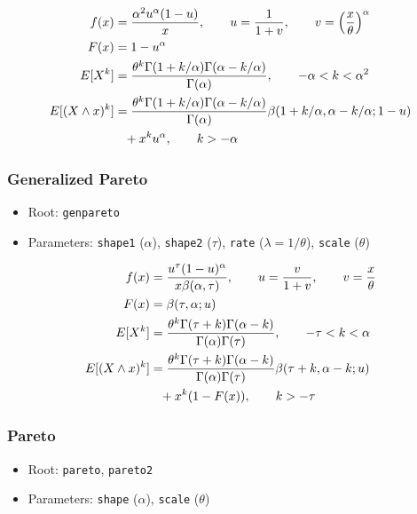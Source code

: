 \documentclass[x11names]{article}
\newcommand{\E}[1]{E[ #1 ]}
\newcommand{\code}[1]{\texttt{#1}}
\begin{document}
\begin{align*}
  f(x)
  &= \frac{\alpha^2 u^\alpha (1 - u)}{x},
    \qquad u = \frac{1}{1 + v},
    \qquad v = \left( \frac{x}{\theta} \right)^\alpha \\
  F(x)
  &= 1 - u^\alpha \\
  \E{X^k}
  &= \frac{%
    \theta^k \Gamma(1+k/\alpha) \Gamma(\alpha-k/\alpha)}{%
    \Gamma(\alpha)},
    \qquad -\alpha < k < \alpha^2 \\
  \E{(X \wedge x)^k}
  &= \frac{%
    \theta^k \Gamma(1+k/\alpha) \Gamma(\alpha-k/\alpha)}{%
    \Gamma(\alpha)}
    \beta(1+k/\alpha, \alpha-k/\alpha; 1-u) \\
  &\phantom{=} + x^k u^\alpha,
    \qquad k > -\alpha

\end{align*}

\subsubsection*{Generalized Pareto}

\begin{itemize}
\item Root: \code{genpareto}
\item Parameters: \code{shape1} ($\alpha$),
      \code{shape2} ($\tau$),
      \code{rate}   ($\lambda = 1/\theta$),
      \code{scale}  ($\theta$)
\end{itemize}

\begin{align*}
  f(x)
  &= \frac{u^\tau (1 - u)^\alpha}{x \beta (\alpha, \tau )},
    \qquad u = \frac{v}{1 + v},
    \qquad v = \frac{x}{\theta} \\
  F(x)
  &= \beta (\tau, \alpha ; u) \\
  \E{X^k}
  &= \frac{%
    \theta^k \Gamma(\tau+k) \Gamma(\alpha-k)}{%
    \Gamma(\alpha) \Gamma(\tau)},
    \qquad -\tau < k < \alpha \\
  \E{(X \wedge x)^k}
  &= \frac{%
    \theta^k \Gamma(\tau+k) \Gamma(\alpha-k)}{%
    \Gamma(\alpha) \Gamma(\tau)}
    \beta(\tau+k, \alpha-k; u) \\
  &\phantom{=} + x^k (1 - F(x)),
    \qquad k > -\tau
\end{align*}

\subsubsection*{Pareto}

\begin{itemize}
\item Root: \code{pareto}, \code{pareto2}
\item Parameters: \code{shape} ($\alpha$),
      \code{scale}  ($\theta$)
\end{itemize}
\end{document}
